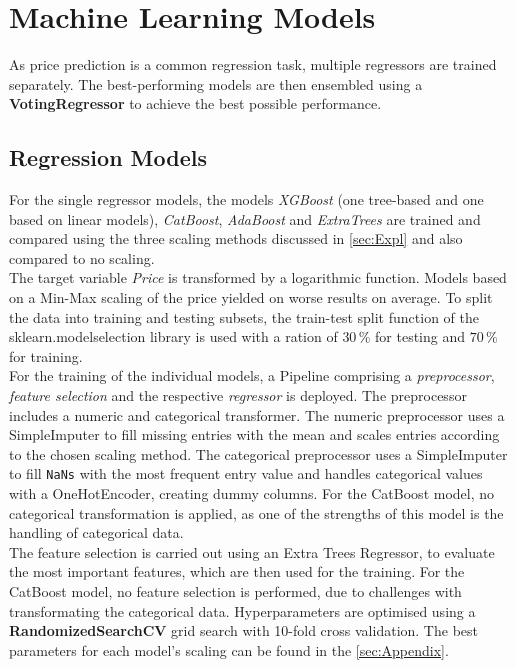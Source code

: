 \section{Machine Learning Models}
\label{sec:ML}
As price prediction is a common regression task, multiple regressors are trained separately. The best-performing 
models are then ensembled using a \textbf{VotingRegressor} to achieve the best possible performance.

\subsection{Regression Models}
\label{sec:regression_models}
For the single regressor models, the models \textit{XGBoost} (one tree-based and one based on linear models), \textit{CatBoost},
\textit{AdaBoost} and \textit{ExtraTrees} are trained and compared using the three scaling methods discussed in \autoref{sec:Expl}
and also compared to no scaling.\\
The target variable \textit{Price} is transformed by a logarithmic function. Models based on a Min-Max scaling of the price yielded on worse results
on average. To split the data into training and testing subsets, the train-test split function of the sklearn.modelselection
library is used with a ration of  $30 \, \% $ for testing and $ 70 \, \%$ for training.\\
For the training of the individual models, a Pipeline comprising a \textit{preprocessor}, \textit{feature selection} and the 
respective \textit{regressor} is deployed. The preprocessor includes a numeric and categorical transformer. The numeric preprocessor uses 
a SimpleImputer to fill missing entries with the mean and scales entries according to the chosen scaling method. The categorical
preprocessor uses a SimpleImputer to fill \texttt{NaNs} with the most frequent entry value and handles categorical values
with a OneHotEncoder, creating dummy columns. For the CatBoost model, no categorical transformation is applied, as one of the strengths
of this model is the handling of categorical data.\\
The feature selection is carried out using an Extra Trees Regressor, to evaluate the most important features, which are then used 
for the training. For the CatBoost model, no feature selection is performed, due to challenges with transformating
the categorical data. Hyperparameters are optimised using a \textbf{RandomizedSearchCV} grid search with 10-fold cross validation. The best parameters
for each model's scaling can be found in the \autoref{sec:Appendix}.\\
